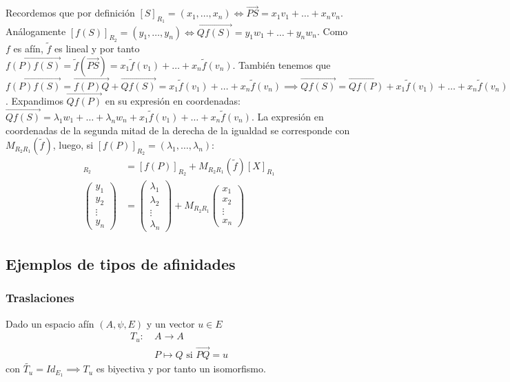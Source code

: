 \documentclass[14pt]{book}
\begin{document}
Recordemos que por definición $[S]_{R_1} = (x_1, \dots, x_n) \iff \overrightarrow{PS} = x_1 v_1  + \dots + x_n v_n$. Análogamente $[f(S)]_{R_2} = (y_1, \dots, y_n) \iff \overrightarrow{Q f(S)} = y_1 w_1 + \dots + y_n w_n$. Como $f$ es afín, $\tilde{f}$ es lineal y por tanto $\overrightarrow{f(P)f(S)} = \tilde{f}(\overrightarrow{PS}) = x_1 \tilde{f}(v_1) + \dots + x_n \tilde{f}(v_n)$. También tenemos que $\overrightarrow{f(P)f(S)} = \overrightarrow{f(P)Q} + \overrightarrow{Qf(S)} = x_1 \tilde{f}(v_1) + \dots + x_n \tilde{f}(v_n) \implies \overrightarrow{Q f(S)} = \overrightarrow{Q f(P)} + x_1 \tilde{f} (v_1) + \dots + x_n \tilde{f} (v_n)$. Expandimos $\overrightarrow{Q f(P)}$ en su expresión en coordenadas: $\overrightarrow{Q f(S)} = \lambda_1 w_1 + \dots + \lambda_n w_n + x_1 \tilde{f} (v_1) + \dots + x_n \tilde{f} (v_n)$. La expresión en coordenadas de la segunda mitad de la derecha de la igualdad se corresponde con $M_{R_2 R_1}(\tilde{f})$, luego, si $[f(P)]_{R_2} = (\lambda_1, \dots, \lambda_n)$:
\begin{align*}
	[S]_{R_2} &= [f(P)]_{R_2} + M_{R_2 R_1}(\tilde{f}) [X]_{R_1} \\
	\left(
	\begin{array}{c}
	y_1 \\ y_2 \\ \vdots \\ y_n
	\end{array}
	\right) &= 
	\left(
	\begin{array}{c}
	\lambda_1 \\ \lambda_2 \\ \vdots \\ \lambda_n
	\end{array}
	\right) + M_{R_2 R_1}\left(
	\begin{array}{c}
	x_1 \\ x_2 \\ \vdots \\ x_n
	\end{array}
	\right)
\end{align*}

\subsection{Ejemplos de tipos de afinidades}

\subsubsection{Traslaciones}
Dado un espacio afín $(A, \psi, E)$ y un vector $u \in E$
\begin{align*}
	T_u :\ &A \longrightarrow A \\
	&P \longmapsto Q \text{ si } \overrightarrow{PQ} = u
\end{align*}
con $\tilde{T_u} = Id_{E_1} \implies T_u$ es biyectiva y por tanto un isomorfismo.
\end{document}
